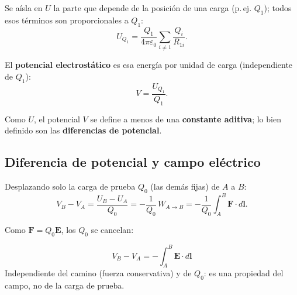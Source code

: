\documentclass[12pt,a4paper]{article}
\begin{document}
Se aísla en $U$ la parte que depende de la posición de una carga (p.\,ej.
$Q_1$); todos esos términos son proporcionales a $Q_1$:
\[
U_{Q_1} = \frac{Q_1}{4\pi\varepsilon_0}\sum_{i\neq 1}\frac{Q_i}{R_{1i}} .
\]

El \textbf{potencial electrostático} es esa energía por unidad de carga
(independiente de $Q_1$):
\[
\boxed{V = \frac{U_{Q_1}}{Q_1}} .
\]

Como $U$, el potencial $V$ se define a menos de una \textbf{constante
aditiva}; lo bien definido son las \textbf{diferencias de potencial}.

\subsection{Diferencia de potencial y campo eléctrico}

Desplazando solo la carga de prueba $Q_0$ (las demás fijas) de $A$ a
$B$:
\[
V_B - V_A = \frac{U_B - U_A}{Q_0} = -\frac{1}{Q_0}\,W_{A\to B}
= -\frac{1}{Q_0}\int_A^B \mathbf{F}\cdot d\mathbf{l} .
\]

Como $\mathbf{F} = Q_0\mathbf{E}$, los $Q_0$ se cancelan:

\begin{keybox}
  \[
  \boxed{V_B - V_A = -\int_A^B \mathbf{E}\cdot d\mathbf{l}}
  \]
  Independiente del camino (fuerza conservativa) y de $Q_0$: es una
  propiedad del campo, no de la carga de prueba.
\end{keybox}
\end{document}
